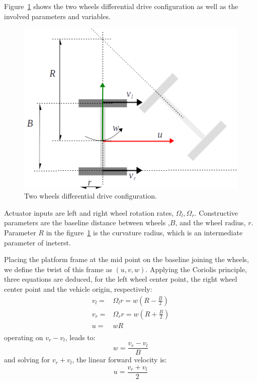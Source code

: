 Figure~\ref{fig:differential_kinematics} shows the two wheels differential drive configuration as well as the involved parameters and variables. 
\begin{figure}[bth!]
  \begin{center}
    \includegraphics[width=1.0\columnwidth]{figures/differential_kinematics.png}
    \caption{Two wheels differential drive configuration.}
    \label{fig:differential_kinematics}
  \end{center}
\end{figure}

Actuator inputs are left and right wheel rotation rates, $\Omega_l, \Omega_r$. Constructive parameters are the baseline distance between wheels ,$B$, and the wheel radius, $r$. Parameter $R$ in the figure~\ref{fig:differential_kinematics} is the curvature radius, which is an intermediate parameter of ineterst.

Placing the platform frame at the mid point on the baseline joining the wheels, we define the twist of this frame as $(u, v, w)$. Applying the Coriolis principle, three equations are deduced, for the left wheel center point, the right wheel center point and the vehicle origin, respectively:
\begin{align}
v_l = & \Omega_l r = w(R-\frac{B}{2}) \\
v_r = & \Omega_r r = w(R+\frac{B}{2}) \\
u = & wR \\
\end{align} 
operating on $v_r-v_l$, leads to:
\begin{equation}
\label{eq:diff_drive_fwd_kinematics_w}
w = \frac{v_r-v_l}{B}
\end{equation}
and solving for $v_r+v_l$, the linear forward velocity is:  
\begin{equation}
\label{eq:diff_drive_fwd_kinematics_u}
u = \frac{v_r+v_l}{2}
\end{equation}

